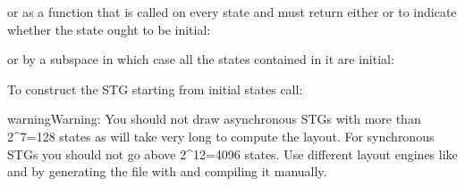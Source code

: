 \documentclass[letterpaper,10pt,english]{sphinxmanual}
\begin{document}
or as a function that is called on every state and must return either  or  to indicate whether the state ought to be initial:

\begin{sphinxVerbatim}[commandchars=\\\{\}]
    \PYG{p}{[}\PYG{p}{]}\PYG{p}{[}\PYG{p}{]}
\end{sphinxVerbatim}

or by a subspace in which case all the states contained in it are initial:

\begin{sphinxVerbatim}[commandchars=\\\{\}]
  
  
\end{sphinxVerbatim}

To construct the STG starting from initial states call:

\begin{sphinxVerbatim}[commandchars=\\\{\}]
    
\end{sphinxVerbatim}

\begin{sphinxadmonition}{warning}{Warning:}
You should not draw asynchronous STGs with more than 2\textasciicircum{}7=128 states as  will take very long to compute the layout.
For synchronous STGs you should not go above 2\textasciicircum{}12=4096 states.
Use different layout engines like  and  by generating the  file with {\hyperref[\detokenize{StateTransitionGraphs:stg2dot}]{}} and compiling it manually.
\end{sphinxadmonition}
\end{document}
